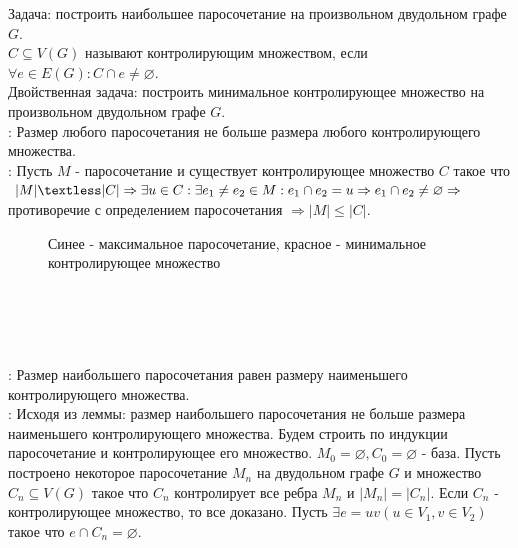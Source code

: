 Задача: построить наибольшее паросочетание на произвольном двудольном графе $G$.\\
$C \subseteq V(G)$ называют контролирующим множеством, если $\forall e \in E(G): C \cap e \neq \varnothing$.\\
Двойственная задача: построить минимальное контролирующее множество на произвольном двудольном графе $G$.\\
\underline{}: Размер любого паросочетания не больше размера любого контролирующего множества.\\
\underline{}: Пусть $M$ - паросочетание и существует контролирующее множество $C$ такое что $|M| \textless |C| \Rightarrow \exists u \in C: \exists e_1 \neq e_2 \in M: e_1 \cap e_2 = u \Rightarrow e_1 \cap e_2 \neq \varnothing \Rightarrow$ противоречие с определением паросочетания $\Rightarrow |M| \leq |C|$.\\
\begin{figure}[h]
    \caption{Синее - максимальное паросочетание, красное - минимальное контролирующее множество}
    \label{fig:Maximal-matching and minimal-cover}
\end{figure}\\\\\\\\
\underline{}: Размер наибольшего паросочетания равен размеру наименьшего контролирующего множества.\\
\underline{}: Исходя из леммы: размер наибольшего паросочетания не больше размера наименьшего контролирующего множества. Будем строить по индукции паросочетание и контролирующее его множество. $M_0 = \varnothing, C_0 = \varnothing$ - база. Пусть построено некоторое паросочетание $M_n$ на двудольном графе $G$ и множество $C_n \subseteq V(G)$ такое что $C_n$ контролирует все ребра $M_n$ и $|M_n| = |C_n|$. Если $C_n$ - контролирующее множество, то все доказано. Пусть $\exists e = uv (u \in V_1, v \in V_2)$ такое что $e \cap C_n = \varnothing$.\\
